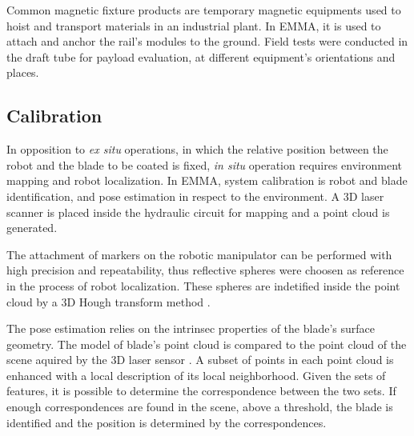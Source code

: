 Common magnetic fixture products are temporary magnetic equipments used to hoist
and transport materials in an industrial plant. In EMMA, it is used to attach
and anchor the rail's modules to the ground. Field tests were conducted in the
draft tube for payload evaluation, at different equipment's orientations and
places.


\subsection{Calibration}

In opposition to \textit{ex situ} operations, in which the relative position
between the robot and the blade to be coated is fixed, \textit{in situ}
operation requires environment mapping and robot localization. In
EMMA, system calibration is robot and blade identification, and pose estimation in
respect to the environment. A 3D laser scanner is placed inside the hydraulic
circuit for mapping and a point cloud is generated.
 
The attachment of markers on the robotic manipulator can be
performed with high precision and repeatability, thus reflective spheres were
choosen as reference in the process of robot localization. These spheres are indetified inside the point cloud by a 3D Hough
transform method \cite{camurri20143d}. 

The pose estimation relies on the intrinsec properties of the blade's surface
geometry. The model of blade's point cloud  is compared to the point cloud of
the scene aquired by the 3D laser sensor \cite{Tombari2010a}. A subset of points
in each point cloud is enhanced with a local description of its local neighborhood. Given the sets of features, it is possible to determine the correspondence between the two sets. If enough correspondences are found in
the scene, above a threshold, the blade is identified and the position is
determined by the correspondences.
